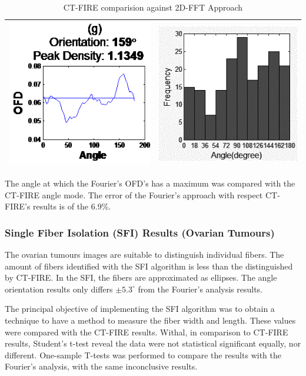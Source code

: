 \documentclass[12pt,a4paper]{article}
\begin{document}
\begin{table}[]
\begin{center}
\begin{tabular}{ |c|c| }
\hline
\includegraphics[width=0.5\linewidth, trim=0 0 0 -10]{FiguresDisertation/t1e.png} &
\includegraphics[width=0.5\linewidth, trim=0 0 0 -10]{FiguresDisertation/t1f.png} \\
\hline    
\end{tabular}
\end{center}
\caption{CT-FIRE comparision against 2D-FFT Approach}
\end{table}

The angle at which the Fourier's OFD's has a maximum was compared with the CT-FIRE angle mode. The error of the Fourier's approach with respect CT-FIRE's results is of the 6.9\%.

\subsubsection{Single Fiber Isolation (SFI) Results (Ovarian Tumours)}
The ovarian tumours images are suitable to distinguish individual fibers. The amount of fibers identified with the SFI algorithm is less than the distinguished by CT-FIRE. In the SFI, the fibers are approximated as ellipses. The angle orientation results only differs $\pm5.3^{\circ}$ from the Fourier’s analysis results.

The principal objective of implementing the SFI algorithm was to obtain a technique to have a method to measure the fiber width and length. These values were compared with the CT-FIRE results. Withal, in comparison to CT-FIRE results, Student’s t-test reveal the data were not statistical significant equally, nor different. One-sample T-tests was performed to compare the results with the Fourier’s analysis, with the same inconclusive results.
\end{document}
